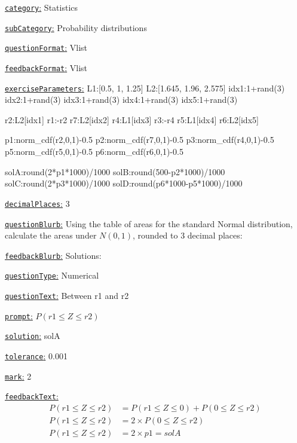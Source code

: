 \documentclass[preview]{standalone}
\newcommand \fieldname[1]{\underline{\texttt{#1}:}}
\begin{document}
\fieldname{category}  %
Statistics

\fieldname{subCategory} %
Probability distributions

\fieldname{questionFormat}
Vlist

\fieldname{feedbackFormat}
Vlist

\fieldname{exerciseParameters}
L1:[0.5, 1, 1.25]
L2:[1.645, 1.96, 2.575]
idx1:1+rand(3)
idx2:1+rand(3)
idx3:1+rand(3)
idx4:1+rand(3)
idx5:1+rand(3)

r2:L2[idx1]
r1:-r2
r7:L2[idx2]
r4:L1[idx3]
r3:-r4
r5:L1[idx4]
r6:L2[idx5]

p1:norm_cdf(r2,0,1)-0.5
p2:norm_cdf(r7,0,1)-0.5
p3:norm_cdf(r4,0,1)-0.5
p5:norm_cdf(r5,0,1)-0.5
p6:norm_cdf(r6,0,1)-0.5

solA:round(2*p1*1000)/1000
solB:round(500-p2*1000)/1000
solC:round(2*p3*1000)/1000
solD:round(p6*1000-p5*1000)/1000

\fieldname{decimalPlaces}
3

\fieldname{questionBlurb}
Using the table of areas for the standard Normal distribution, calculate the areas under $N(0,1)$, rounded to 3 decimal places:

\fieldname{feedbackBlurb}
Solutions:

\fieldname{questionType}
Numerical

\fieldname{questionText}
Between {r1} and {r2}

\fieldname{prompt}
$P({r1} \le Z \le {r2})$

\fieldname{solution}
solA

\fieldname{tolerance}
0.001

\fieldname{mark}
2

\fieldname{feedbackText}
\[
\begin{aligned}
P({r1} \le Z \le {r2}) & = P({r1} \le Z \le 0 ) + P( 0 \le Z \le {r2})\\
P({r1} \le Z \le {r2}) & = 2 \times P( 0 \le Z \le {r2})\\
P({r1} \le Z \le {r2}) & = 2 \times {p1} = {solA}\\
\end{aligned}
\]
\end{document}
